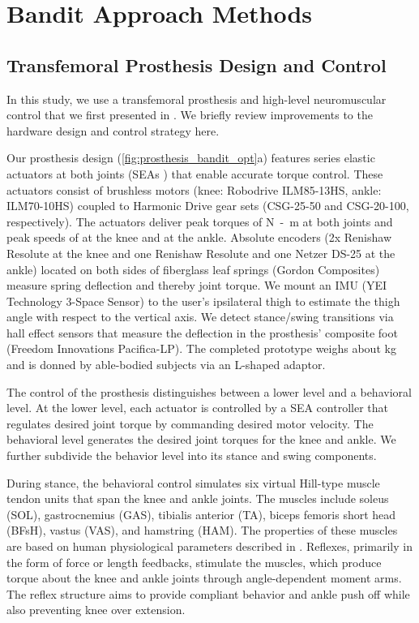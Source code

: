\section{Bandit Approach Methods} 

\subsection{Transfemoral Prosthesis Design and Control}
In this study, we use a transfemoral prosthesis and high-level neuromuscular
control that we first presented in \citet{thatte2016toward}. We briefly review
improvements to the hardware design and control strategy here.

Our prosthesis design (\cref{fig:prosthesis_bandit_opt}a) features series
elastic actuators at both joints (SEAs \citep{pratt1995series}) that enable
accurate torque control. These actuators consist of brushless motors (knee:
Robodrive ILM85-13HS, ankle: ILM70-10HS) coupled to Harmonic Drive gear sets
(CSG-25-50 and CSG-20-100, respectively).  The actuators deliver peak torques of
\unit[170]{N-m} at both joints and peak speeds of  at the
knee and  at the ankle. Absolute encoders (2x Renishaw
Resolute at the knee and one Renishaw Resolute and one Netzer DS-25 at the
ankle) located on both sides of fiberglass leaf springs (Gordon Composites)
measure spring deflection and thereby joint torque. We mount an IMU (YEI
Technology 3-Space Sensor) to the user's ipsilateral thigh to estimate the thigh
angle with respect to the vertical axis.  We detect stance/swing transitions via
hall effect sensors that measure the deflection in the prosthesis' composite
foot (Freedom Innovations Pacifica-LP).  The completed prototype weighs about
\unit[6]{kg} and is donned by able-bodied subjects via an L-shaped adaptor.

The control of the prosthesis distinguishes between a lower level and a
behavioral level. At the lower level, each actuator is controlled by a SEA
controller \citep{schepelmann2012development} that regulates desired joint
torque by commanding desired motor velocity. The behavioral level generates the
desired joint torques for the knee and ankle. We further subdivide the behavior
level into its stance and swing components.

During stance, the behavioral control simulates six virtual Hill-type muscle
tendon units that span the knee and ankle joints. The muscles include soleus
(SOL), gastrocnemius (GAS), tibialis anterior (TA), biceps femoris short head
(BFsH), vastus (VAS), and hamstring (HAM). The properties of these muscles are
based on human physiological parameters described in \citet{song2015neural}.
Reflexes, primarily in the form of force or length feedbacks, stimulate the
muscles, which produce torque about the knee and ankle joints through
angle-dependent moment arms. The reflex structure aims to provide compliant
behavior and ankle push off while also preventing knee over extension.

